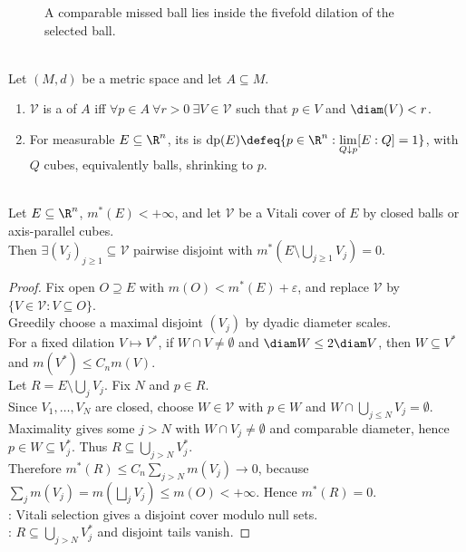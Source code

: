 \begin{figure}[H]
  \centering
  
  \caption{A comparable missed ball lies inside the fivefold dilation of the selected ball.}
  \label{fig:vitali-fivefold-dilation}
\end{figure}

\begin{definition} \label{def:vitali-coverings-and-density-points} \\
Let $(M,d)$ be a metric space and let $A\subseteq M$.
\begin{enumerate}[label=(\roman*)]
\setlength{\itemsep}{0pt}
\item $\mathcal{V}$ is a  of $A$ iff $\forall p\in A\ \forall r>0\ \exists V\in\mathcal{V}$ such that $p\in V$ and $\diam(V)<r$.
\item For measurable $E\subseteq\R^n$, its  is $\operatorname{dp}(E)\defeq\{p\in\R^n:\lim\limits_{Q\downarrow p}[E:Q]=1\}$, with $Q$ cubes, equivalently balls, shrinking to $p$.
\end{enumerate}
\end{definition}

\begin{theorem} \label{thm:vitali-covering-lemma-balls-cubes} \\
Let $E\subseteq\R^n$, $m^\ast(E)<+\infty$, and let $\mathcal{V}$ be a Vitali cover of $E$ by closed balls or axis-parallel cubes.\\
Then $\exists(V_j)_{j\geq1}\subseteq\mathcal{V}$ pairwise disjoint with $m^\ast(E\setminus\bigcup\limits_{j\geq1}V_j)=0$.
\begin{proof}
Fix open $O\supseteq E$ with $m(O)<m^\ast(E)+\varepsilon$, and replace $\mathcal{V}$ by $\{V\in\mathcal{V}:V\subseteq O\}$.\\
Greedily choose a maximal disjoint $(V_j)$ by dyadic diameter scales.\\
For a fixed dilation $V\mapsto V^\ast$, if $W\cap V\neq\emptyset$ and $\diam W\leq2\diam V$, then $W\subseteq V^\ast$ and $m(V^\ast)\leq C_nm(V)$.\\
Let $R=E\setminus\bigcup\limits_jV_j$. Fix $N$ and $p\in R$.\\
Since $V_1,\ldots,V_N$ are closed, choose $W\in\mathcal{V}$ with $p\in W$ and $W\cap\bigcup\limits_{j\leq N}V_j=\emptyset$. Maximality gives some $j>N$ with $W\cap V_j\neq\emptyset$ and comparable diameter, hence $p\in W\subseteq V_j^\ast$. Thus $R\subseteq\bigcup\limits_{j>N}V_j^\ast$.\\
Therefore $m^\ast(R)\leq C_n\sum\limits_{j>N}m(V_j)\to0$, because $\sum\limits_jm(V_j)=m(\bigsqcup\limits_jV_j)\leq m(O)<+\infty$. Hence $m^\ast(R)=0$.\\
: Vitali selection gives a disjoint cover modulo null sets.\\
: $R\subseteq\bigcup\limits_{j>N}V_j^\ast$ and disjoint tails vanish.
\end{proof}
\end{theorem}

